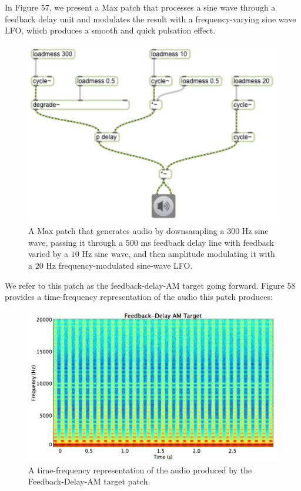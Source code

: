 \documentclass[12pt]{report} 	%
\numberwithin{figure}{chapter}
\numberwithin{table}{chapter}
\numberwithin{equation}{chapter}
\begin{document}
\begin{flushleft}
In Figure 57, we present a Max patch that processes a sine wave through a feedback delay unit and modulates the result with a frequency-varying sine wave LFO, which produces a smooth and quick pulsation effect.
\begin{figure}[h!]
\vspace{24pt}
\begin{center}
\includegraphics[scale=0.8]{DelayFeedbackAM}
\caption[Delay feedback AM Max patch]{A Max patch that generates audio by downsampling a $300$ Hz sine wave, passing it through a $500$ ms feedback delay line with feedback varied by a $10$ Hz sine wave, and then amplitude modulating it with a $20$ Hz frequency-modulated sine-wave LFO.}
\end{center}
\vspace{6pt}
\end{figure}
We refer to this patch as the feedback-delay-AM target going forward. Figure 58 provides a time-frequency representation of the audio this patch produces:
\begin{figure}[h!]
\vspace{30pt}
\begin{center}
\includegraphics[width=\linewidth]{FeedbackDelayAMTargetSTFT}
\caption[Delay feedback AM time-frequency representation]{A time-frequency representation of the audio produced by the Feedback-Delay-AM target patch.}
\end{center}
\vspace{6pt}
\end{figure}


\end{flushleft}
\end{document}
